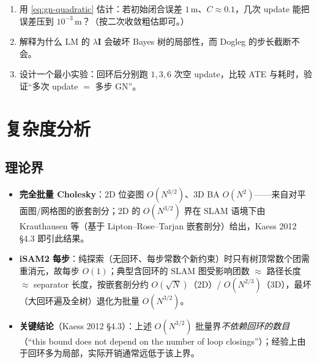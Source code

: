 \begin{practice}
\begin{enumerate}
  \item 用 \cref{eq:gn-quadratic} 估计：若初始闭合误差 $1$\,m、$C\approx 0.1$，几次 update 能把误差压到 $10^{-3}$\,m？（按二次收敛粗估即可。）
  \item 解释为什么 LM 的 $\lambda\mathbf{I}$ 会破坏 Bayes 树的局部性，而 Dogleg 的步长截断不会。
  \item 设计一个最小实验：回环后分别跑 $1,3,6$ 次空 update，比较 ATE 与耗时，验证“多次 update $=$ 多步 GN”。
\end{enumerate}
\end{practice}

\section{复杂度分析}
\label{sec:isam-complexity}

\subsection{理论界}
\label{sec:isam-bounds}

\begin{itemize}
  \item \textbf{完全批量 Cholesky}：2D 位姿图 $O(N^{3/2})$、3D BA $O(N^2)$——来自对平面图/网格图的嵌套剖分；2D 的 $O(N^{3/2})$ 界在 SLAM 语境下由 Krauthausen 等\cite{krauthausen2006exploiting}（基于 Lipton--Rose--Tarjan 嵌套剖分\cite{lipton1979generalized}）给出，Kaess 2012 §4.3\cite{kaess2012isam2} 即引此结果。
  \item \textbf{iSAM2 每步}：纯探索（无回环、每步常数个新约束）时只有树顶常数个团需重消元，故每步 $O(1)$\cite{kaess2012isam2}；典型含回环的 SLAM 图受影响团数 $\approx$ 路径长度 $\approx$ separator 长度，按嵌套剖分约 $O(\sqrt N)$（2D）/ $O(N^{2/3})$（3D），最坏（大回环遍及全树）退化为批量 $O(N^{3/2})$。
  \item \textbf{关键结论}（Kaess 2012 §4.3\cite{kaess2012isam2}）：上述 $O(N^{3/2})$ 批量界\emph{不依赖回环的数目}（“this bound does not depend on the number of loop closings”）；经验上由于回环多为局部，实际开销通常远低于该上界。
\end{itemize}

